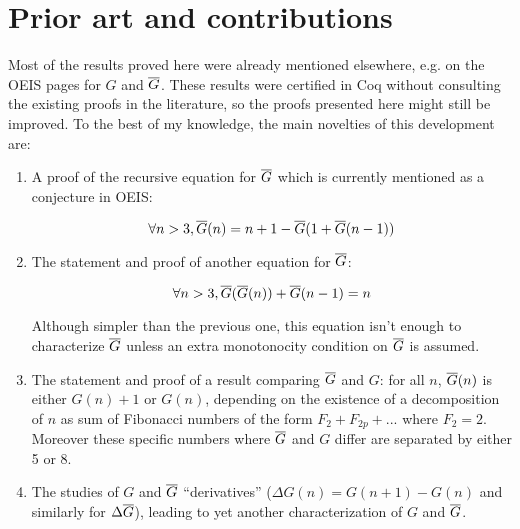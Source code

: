 \documentclass[a4paper,11pt]{article}
\begin{document}
\section{Prior art and contributions}
Most of the results proved here were already mentioned elsewhere,
e.g. on the OEIS pages for $G$ and $\overline{G}$. These results were certified
in Coq without consulting the existing proofs in the literature, so
the proofs presented here might still be improved. To the best of
my knowledge, the main novelties of this development are:
\begin{enumerate}
\item
  A proof of the recursive
equation for $\overline{G}$ which is currently mentioned as a conjecture in OEIS:

$$\forall n>3, \overline{G}(n) = n+1 - \overline{G}(1+\overline{G}(n-1))$$

\item
  The statement and proof of another equation for $\overline{G}$:

$$\forall n>3, \overline{G}(\overline{G}(n)) + \overline{G}(n-1) = n$$

Although simpler than the previous one, this equation isn't
enough to characterize $\overline{G}$ unless an extra monotonocity
condition on $\overline{G}$ is assumed.

\item
  The statement and proof of a result comparing $\overline{G}$ and $G$:
for all $n$, $\overline{G}(n)$ is either $G(n)+1$ or $G(n)$, depending
on the existence of a decomposition of $n$ as sum of Fibonacci numbers
of the form $F_2 + F_{2p} + ...$ where $F_2 = 2$. Moreover these
specific numbers where $\overline{G}$ and $G$ differ are separated by either
5 or 8.

\item The studies of $G$ and $\overline{G}$ ``derivatives''
  ($\Delta G(n) = G(n+1)-G(n)$ and similarly for $\Delta\overline{G}$),
  leading to yet another characterization of $G$ and $\overline{G}$.

\end{enumerate}
\end{document}
